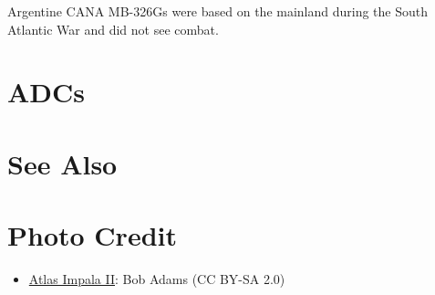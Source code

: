 Argentine CANA MB-326Gs were based on the mainland during the South Atlantic War and did not see combat.

\section{ADCs}

\begin{adclist}
\end{adclist}

\section{See Also}
\begin{typelist}
\end{typelist}

\section{Photo Credit}
\begin{itemize}\raggedright
    \item \href{https://commons.wikimedia.org/wiki/File:SAAF_Impala_MkII_1075_(6902824683).jpg}{Atlas Impala II}: Bob Adams (CC BY-SA 2.0)
\end{itemize}
